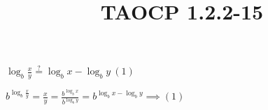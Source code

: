 \documentclass{article}
\title{TAOCP 1.2.2\mbox{-}15}
\begin{document}
\maketitle

\( \log_b{\frac{x}{y}} \overset{?}{=} \log_b{x} - \log_b{y}\ (1) \)

\( b^{\log_b{\frac{x}{y}}} = \frac{x}{y} = \frac{b^{\log_b{x}}}{b^{\log_b{y}}} = b^{\log_b{x} - \log_b{y}} \implies (1) \)
\end{document}
